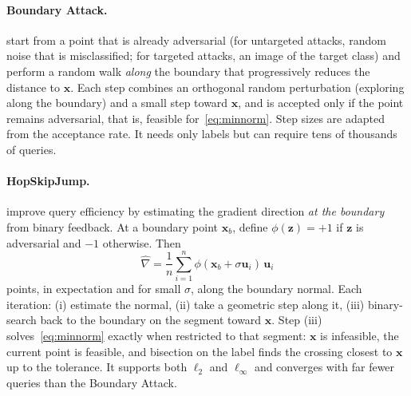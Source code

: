 \documentclass[10pt,a4paper]{extarticle}
\theoremstyle{definition}
\newcommand{\x}{\mathbf{x}}
\begin{document}
\paragraph{Boundary Attack.} \citet{brendel2018decision} start from a point that is already adversarial (for untargeted attacks, random noise that is misclassified; for targeted attacks, an image of the target class) and perform a random walk \emph{along} the boundary that progressively reduces the distance to \(\x\). Each step combines an orthogonal random perturbation (exploring along the boundary) and a small step toward \(\x\), and is accepted only if the point remains adversarial, that is, feasible for~\eqref{eq:minnorm}. Step sizes are adapted from the acceptance rate. It needs only labels but can require tens of thousands of queries.

\paragraph{HopSkipJump.} \citet{chen2020hopskipjump} improve query efficiency by estimating the gradient direction \emph{at the boundary} from binary feedback. At a boundary point \(\x_b\), define \(\phi(\mathbf{z}) = +1\) if \(\mathbf{z}\) is adversarial and \(-1\) otherwise. Then
\[
\widehat{\nabla} = \frac{1}{n}\sum_{i=1}^{n}\phi(\x_b+\sigma\mathbf{u}_i)\,\mathbf{u}_i
\]
points, in expectation and for small \(\sigma\), along the boundary normal. Each iteration: (i) estimate the normal, (ii) take a geometric step along it, (iii) binary-search back to the boundary on the segment toward \(\x\). Step (iii) solves~\eqref{eq:minnorm} exactly when restricted to that segment: \(\x\) is infeasible, the current point is feasible, and bisection on the label finds the crossing closest to \(\x\) up to the tolerance. It supports both \(\ell_2\) and \(\ell_\infty\) and converges with far fewer queries than the Boundary Attack.
\end{document}
